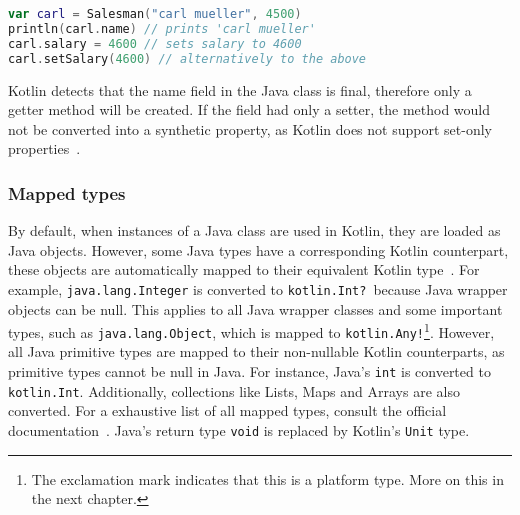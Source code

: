 \documentclass[a4paper,11pt]{article}
\begin{document}
\begin{lstlisting}[language=Kotlin, title={Access a Salesman instance in Kotlin}]
var carl = Salesman("carl mueller", 4500)
println(carl.name) // prints 'carl mueller'
carl.salary = 4600 // sets salary to 4600
carl.setSalary(4600) // alternatively to the above
\end{lstlisting}

Kotlin detects that the name field in the Java class is final, therefore only a getter method will be created. If the field had only a setter, the method would not be converted into a synthetic property, as Kotlin does not support set-only properties~\cite{interop-synthetic-property}.

\subsubsection{Mapped types}
By default, when instances of a Java class are used in Kotlin, they are loaded as Java objects. However, some Java types have a corresponding Kotlin counterpart, these objects are automatically mapped to their equivalent Kotlin type~\cite{interop-mapped-types}. For example, \texttt{java.lang.\allowbreak Integer} is converted to \texttt{kotlin.Int?}\ because Java wrapper objects can be null. This applies to all Java wrapper classes and some important types, such as \texttt{java.lang.Object}, which is mapped to \texttt{kotlin.Any!}\footnote{The exclamation mark indicates that this is a platform type. More on this in the next chapter.}. However, all Java primitive types are mapped to their non-nullable Kotlin counterparts, as primitive types cannot be null in Java. For instance, Java's \texttt{int} is converted to \texttt{kotlin.Int}. Additionally, collections like Lists, Maps and Arrays are also converted. For a exhaustive list of all mapped types, consult the official documentation~\cite{interop-mapped-types}. Java's return type \texttt{void} is replaced by Kotlin's \texttt{Unit} type.
\end{document}
